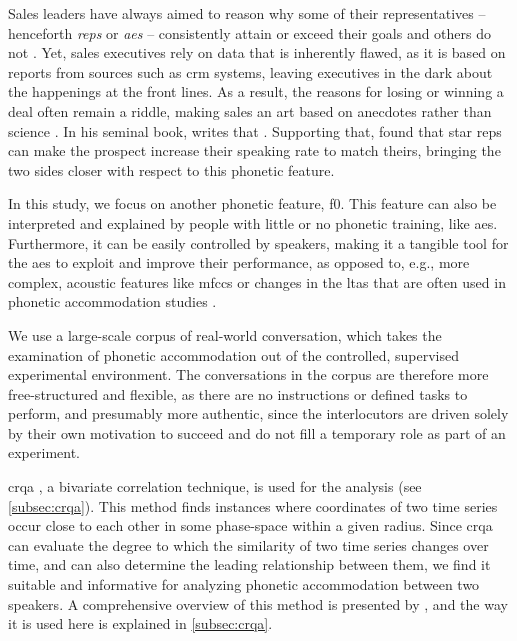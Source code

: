 Sales leaders have always aimed to reason why some of their representatives -- henceforth \emph{reps} or \emph{\acp{ae}} -- consistently attain or exceed their goals and others do not \citep{Kovac2017its}.
Yet, sales executives rely on data that is inherently flawed, as it is based on reports from sources such as \ac{crm} systems, leaving executives in the dark about the happenings at the front lines.
As a result, the reasons for losing or winning a deal often remain a riddle, making sales an art based on anecdotes rather than science \citep{Yohn2016best, Martin2017six}.
In his seminal book, \citet{Gladwell2006tipping} writes that .
Supporting that, \citet{Orlob2018nine} found that star reps can make the prospect increase their speaking rate to match theirs, bringing the two sides closer with respect to this phonetic feature.

In this study, we focus on another phonetic feature, \ac{f0}.
This feature can also be interpreted and explained by people with little or no phonetic training, like \acp{ae}.
Furthermore, it can be easily controlled by speakers, making it a tangible tool for the \acp{ae} to exploit and improve their performance, as opposed to, e.g., more complex, acoustic features like \acp{mfcc} or changes in the \ac{ltas} that are often used in phonetic accommodation studies \citep{Levitan2011measuring,Borrie2019syncing}.

We use a large-scale corpus of real-world conversation, which takes the examination of phonetic accommodation out of the controlled, supervised experimental environment.
The conversations in the corpus are therefore more free-structured and flexible, as there are no instructions or defined tasks to perform, and presumably more authentic, since the interlocutors are driven solely by their own motivation to succeed and do not fill a temporary role as part of an experiment.

\Ac{crqa} \citep{Zbilut1998detecting}, a bivariate correlation technique, is used for the analysis (see \cref{subsec:crqa}).
This method finds instances where coordinates of two time series occur close to each other in some phase-space within a given radius.
Since \ac{crqa} can evaluate the degree to which the similarity of two time series changes over time, and can also determine the leading relationship between them, we find it suitable and informative for analyzing phonetic accommodation between two speakers.
A comprehensive overview of this method is presented by \citet{Wallot2018analyzing}, and the way it is used here is explained in \cref{subsec:crqa}.

